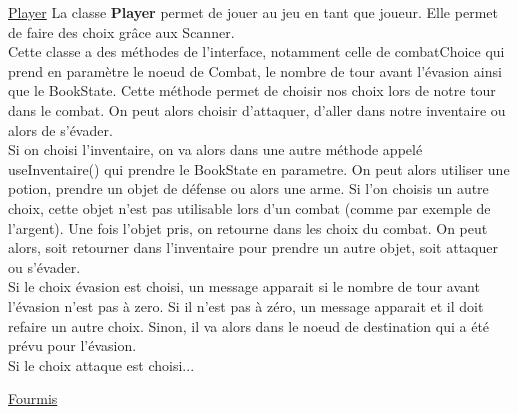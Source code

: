 	\underline{Player}
		La classe \textbf{Player} permet de jouer au jeu en tant que joueur. Elle permet de faire des choix grâce aux Scanner.\\ Cette classe a des méthodes de l'interface, notamment celle de combatChoice qui prend en paramètre le noeud de Combat, le nombre de tour avant l'évasion ainsi que le BookState. Cette méthode permet de choisir nos choix lors de notre tour dans le combat. On peut alors choisir d'attaquer, d'aller dans notre inventaire ou alors de s'évader.\\
		Si on choisi l'inventaire, on va alors dans une autre méthode appelé useInventaire() qui prendre le BookState en parametre. On peut alors utiliser une potion, prendre un objet de défense ou alors une arme. Si l'on choisis un autre choix, cette objet n'est pas utilisable lors d'un combat (comme par exemple de l'argent). Une fois l'objet pris, on retourne dans les choix du combat. On peut alors, soit retourner dans l'inventaire pour prendre un autre objet, soit attaquer ou s'évader.\\
		Si le choix évasion est choisi, un message apparait si le nombre de tour avant l'évasion n'est pas à zero. Si il n'est pas à zéro, un message apparait et il doit refaire un autre choix. Sinon, il va alors dans le noeud de destination qui a été prévu pour l'évasion.\\
		Si le choix attaque est choisi...


	\underline{Fourmis}
